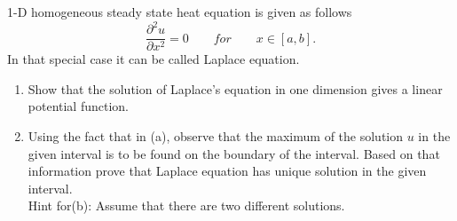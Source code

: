 1-D homogeneous steady state heat equation is given as follows \[\frac{\partial^2 u}{\partial x^2}=0 \qquad for \qquad x\in[a,b].\] In that special case it can be called Laplace equation.

\begin{enumerate}
\item Show that the solution of Laplace's equation in one dimension gives a linear potential function. 
\item Using the fact that in (a), observe that the maximum of the solution $u$ in the given interval is to be found on the boundary of the interval. Based on that information prove that Laplace equation has unique solution in the given interval. \\
Hint for(b): Assume that there are two different solutions.

\end{enumerate}

